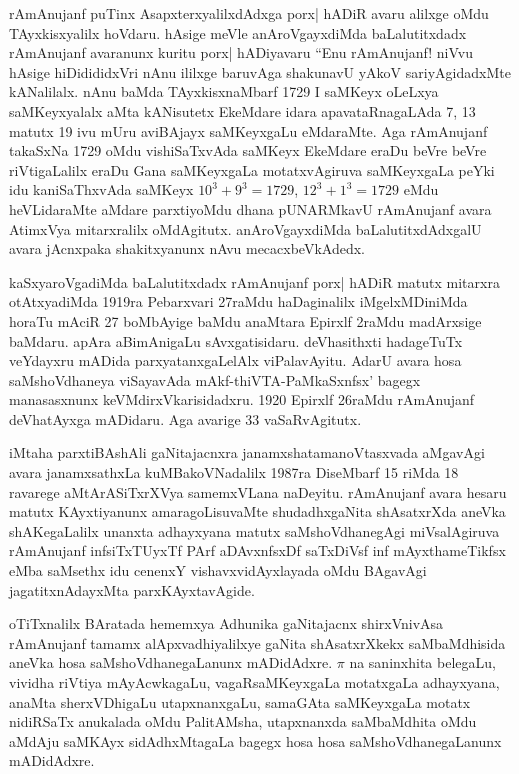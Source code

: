 rAmAnujanf puTinx AsapxterxyalilxdAdxga porx| hADiR avaru alilxge oMdu TAyxkisx\-yalilx hoVdaru. hAsige meVle anAroVgayxdiMda baLalutitxdadx rAmAnujanf ava\-ranunx kuritu porx| hADiyavaru ``Enu rAmAnujanf! niVvu hAsige hiDidididxVri nAnu ililxge baruvAga shakunavU yAkoV sariyAgidadxMte kANalilalx. nAnu baMda TAyxkisx\break naMbarf {\rm 1729} I saMKeyx oLeLxya saMKeyxyalalx aMta kANisutetx EkeMdare idara apavataRnagaLAda {\rm 7, 13} matutx {\rm 19} ivu mUru aviBAjayx saMKeyxgaLu eMdaraMte. Aga rAmAnujanf takaSxNa {\rm 1729} oMdu vishiSaTxvAda saMKeyx EkeMdare eraDu beVre beVre riVtigaLalilx eraDu Gana saMKeyxgaLa motatxvAgiruva saMKeyxgaLa peYki idu kaniSaThxvAda saMKeyx $10^{3}+9^{3}=1729$, $12^{3}+1^{3}=1729$ eMdu heVLidaraMte aMdare parxtiyoMdu dhana pUNARMkavU rAmAnujanf avara AtimxVya mitarxralilx oMdAgitutx. anAroVgayxdiMda baLalutitxdAdxgalU avara jAcnxpaka shakitxyanunx nAvu mecacxbeVkAdedx.

kaSxyaroVgadiMda baLalutitxdadx rAmAnujanf porx| hADiR matutx mitarxra otAtxya\-diMda {\rm 1919}ra Pebarxvari {\rm 27}raMdu haDaginalilx iMgelxMDiniMda horaTu mAciR {\rm 27} boMbAyige baMdu anaMtara Epirxlf {\rm 2}raMdu madArxsige baMdaru. apAra aBimAnigaLu sAvxgatisidaru. deVhasithxti hadageTuTx veYdayxru mADida parxyatanxgaLelAlx viPala\-vAyitu. AdarU avara hosa saMshoVdhaneya viSayavAda mAkf-thiVTA-PaMkaSxnfsx' bagegx manasasxnunx keVMdirxVkarisidadxru. {\rm 1920} Epirxlf {\rm 26}raMdu rAmAnujanf deVhatAyxga mADidaru. Aga avarige {\rm 33} vaSaRvAgitutx.

iMtaha parxtiBAshAli gaNitajacnxra janamxshatamanoVtasxvada aMgavAgi avara janamxsathxLa kuMBakoVNadalilx {\rm 1987}ra DiseMbarf {\rm 15} riMda {\rm 18} ravarege aMtArASiTxrXVya samemxVLana naDeyitu. rAmAnujanf avara hesaru matutx KAyxtiyanunx amaragoLisuvaMte shudadhx\-gaNita shAsatxrXda aneVka shAKegaLalilx unanxta adhayxyana matutx saMshoVdhanegAgi miVsalAgiruva rAmAnujanf infsiTxTUyxTf PArf aDAvxnfsxDf saTxDiVsf inf mAyxthameTikfsx eMba saMsethx idu cenenxY vishavxvidAyxlayada oMdu BAgavAgi jagatitxnAdayxMta parxKAyxtavAgide.

oTiTxnalilx BAratada hememxya Adhunika gaNitajacnx shirxVnivAsa rAmAnujanf tamamx alApxvadhiyalilxye gaNita shAsatxrXkekx saMbaMdhisida aneVka hosa saMshoVdhanegaLanunx mADidAdxre. $\pi$ na saninxhita belegaLu, vividha riVtiya mAyAcwkagaLu, vagaRsaMKeyxgaLa motatxgaLa adhayxyana, anaMta sherxVDhigaLu utapxnanxgaLu, samaGAta saMKeyxgaLa motatx nidiRSaTx anukalada oMdu PalitAMsha, utapxnanxda saMbaMdhita oMdu aMdAju saMKAyx sidAdhxMtagaLa bagegx hosa hosa saMshoVdhanegaLanunx mADidAdxre.

